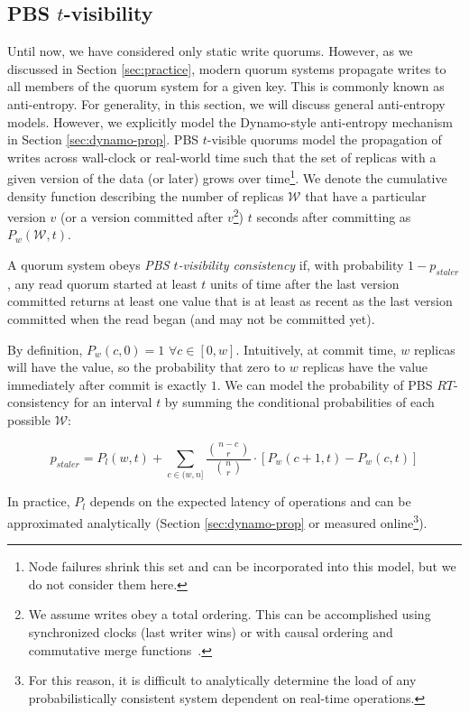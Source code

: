 \documentclass{vldb}
\begin{document}
\subsection{PBS $t$-visibility}

Until now, we have considered only static write quorums.  However, as
we discussed in Section \ref{sec:practice}, modern quorum systems
propagate writes to all members of the quorum system for a given key.
This is commonly known as anti-entropy.  For generality, in this
section, we will discuss general anti-entropy models. However, we
explicitly model the Dynamo-style anti-entropy mechanism in Section
\ref{sec:dynamo-prop}.  PBS $t$-visible quorums model the
propagation of writes across wall-clock or real-world time such that
the set of replicas with a given version of the data (or later) grows
over time\footnote{Node failures shrink this set and can be
  incorporated into this model, but we do not consider them here.}.
We denote the cumulative density function describing the number of
replicas $\mathcal{W}$ that have a particular version $v$ (or a
version committed after $v$\footnote{We assume writes obey a total
  ordering. This can be accomplished using synchronized clocks (last
  writer wins) or with causal ordering and commutative merge
  functions~\cite{cops}.}) $t$ seconds after committing as
$P_w(\mathcal{W}, t)$.

\begin{definition}
A quorum system obeys \textit{PBS $t$-visibility consistency} if, with
probability $1-p_{staler}$, any read quorum started at least $t$ units
of time after the last version committed returns at least one value
that is at least as recent as the last version committed when the read
began (and may not be committed yet).
\end{definition}

By definition, $P_w(c,0) = 1$ $\forall c \in [0, w]$.  Intuitively, at
commit time, $w$ replicas will have the value, so the probability that
zero to $w$ replicas have the value immediately after commit is
exactly $1$.  We can model the probability of PBS $RT$-consistency for an interval $t$ by summing the conditional probabilities of each possible $\mathcal{W}$:

\begin{equation}
p_{staler} = P_l(w, t)+\sum_{c\in(w, n]} \frac{{n-c \choose r}}{{n \choose r}}\cdot [P_w(c+1, t)-P_w(c,t)]
\end{equation}

In practice, $P_l$ depends on the expected latency of operations and can be
approximated analytically (Section \ref{sec:dynamo-prop} or measured
online\footnote{For this reason, it is difficult to analytically
  determine the load of any probabilistically consistent system
  dependent on real-time operations.}).
\end{document}
